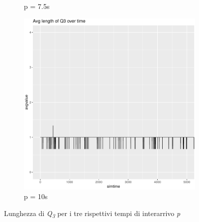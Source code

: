 \documentclass[a4paper,11pt]{article}
\begin{document}
\begin{figure}[h!]
\begin{subfigure}{.5\textwidth}
  \caption{p = 7.5s}
  \label{fig:sfig2}
\end{subfigure}
\begin{subfigure}{\textwidth}
  \centering
  \includegraphics[width=.45\linewidth]{images/chart-q3avglength-10.png}
  \caption{p = 10s}
  \label{fig:sfig2}
\end{subfigure}
\caption{Lunghezza di \textit{Q\textsubscript{3}} per i tre rispettivi tempi di interarrivo \textit{p}}
\label{fig:fig}
\end{figure}
\newpage
\end{document}
